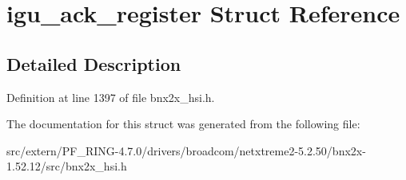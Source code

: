 \hypertarget{structigu__ack__register}{
\section{igu\_\-ack\_\-register Struct Reference}
\label{structigu__ack__register}
}


\subsection{Detailed Description}


Definition at line 1397 of file bnx2x\_\-hsi.h.



The documentation for this struct was generated from the following file:\begin{DoxyCompactItemize}
\item 
src/extern/PF\_\-RING-\/4.7.0/drivers/broadcom/netxtreme2-\/5.2.50/bnx2x-\/1.52.12/src/bnx2x\_\-hsi.h\end{DoxyCompactItemize}
